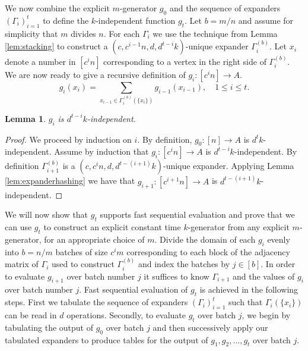 \documentclass[a4paper,11pt]{article}
\theoremstyle{plain}
\newtheorem{lemma}{Lemma}
\theoremstyle{definition}
\begin{document}
We now combine the explicit $m$-generator $g_{0}$ and the sequence of expanders $\left(\Gamma_{i}\right)^{t}_{i = 1}$ to define the $k$-independent function $g_{t}$.
Let $b = m/n$ and assume for simplicity that $m$ divides $n$. 
For each $\Gamma_{i}$ we use the technique from Lemma \ref{lem:stacking} to construct a $(c, c^{i-1}n, d, d^{t-i}k)$-unique expander $\Gamma_{i}^{(b)}$.
Let $x_{i}$ denote a number in $[c^{i}n]$ corresponding to a vertex in the right side of $\Gamma_{i}^{(b)}$. 
We are now ready to give a recursive definition of $g_{i} : [c^{i}n] \to A$.
\begin{equation}
g_{i}(x_{i}) = 
\sum \limits_{x_{i-1} \in \Gamma_{i}^{(b)}(\{x_{i}\})} g_{i-1}(x_{i-1}), \quad 1 \leq i \leq t.
\label{eq:gexplicit}
\end{equation}
\begin{lemma}
$g_{i}$ is $d^{t-i}k$-independent. 
\end{lemma}
\begin{proof}
We proceed by induction on $i$. 
By definition, $g_{0} : [n] \to A$ is $d^{t}k$-independent.
Assume by induction that $g_{i} : [c^{i}n] \to A$ is $d^{t-i}k$-independent.
By definition $\Gamma_{i+1}^{(b)}$ is a $(c, c^{i}n, d, d^{t-(i+1)}k)$-unique expander.
Applying Lemma \ref{lem:expanderhashing} we have that $g_{i+1} : [c^{i+1}n] \to A$ is $d^{t-(i+1)}k$-independent.
\end{proof}

We will now show that $g_{t}$ supports fast sequential evaluation and prove that we can use $g_{t}$ to construct an explicit constant time $k$-generator from any explicit \mbox{$m$-generator}, for an appropriate choice of $m$.
Divide the domain of each $g_{i}$ evenly into $b = n/m$ batches of size $c^{i}m$ corresponding to each block of the adjacency matrix of $\Gamma_{i}$ used to construct $\Gamma_{i}^{(b)}$ and index the batches by $j \in [b]$. 
In order to evaluate $g_{i+1}$ over batch number $j$ it suffices to know $\Gamma_{i+1}$ and the values of $g_{i}$ over batch number $j$.
Fast sequential evaluation of $g_{t}$ is achieved in the following steps.
First we tabulate the sequence of expanders $\left(\Gamma_{i}\right)^{t}_{i = 1}$ such that $\Gamma_{i}(\{x_{i}\})$ can be read in $d$ operations.
Secondly, to evaluate $g_{t}$ over batch $j$, we begin by tabulating the output of $g_{0}$ over batch $j$ and then successively apply our tabulated expanders to produce tables for the output of $g_{1}, g_{2}, \dots, g_{t}$ over batch $j$.
\end{document}
